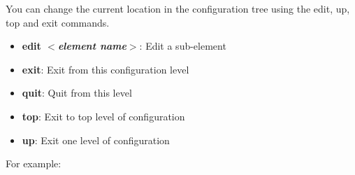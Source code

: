 \documentclass[11pt]{article}
\begin{document}
\noindent{}
\vspace{0.1in}

\noindent
You can change the current location in the configuration tree using
the edit, up, top and exit commands.
\begin{itemize}
\item \textbf{edit $<$\textit{element name}$>$}:       Edit a sub-element
\item \textbf{exit}:       Exit from this configuration level
\item \textbf{quit}:       Quit from this level
\item \textbf{top}:        Exit to top level of configuration
\item \textbf{up}:         Exit one level of configuration
\end{itemize}

\noindent
For example:
\vspace{0.1in}
\end{document}
